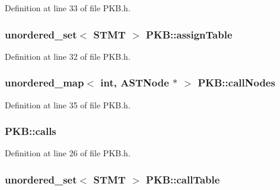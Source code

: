 Definition at line 33 of file P\-K\-B.\-h.

\hypertarget{class_p_k_b_a616513239f3fa6971424332dfabe0ead}{
\subsubsection[{assign\-Table}]{\setlength{\rightskip}{0pt plus 5cm}unordered\-\_\-set$<$ {\bf S\-T\-M\-T} $>$ P\-K\-B\-::assign\-Table\hspace{0.3cm}{\ttfamily [static]}}}\label{class_p_k_b_a616513239f3fa6971424332dfabe0ead}


Definition at line 32 of file P\-K\-B.\-h.

\hypertarget{class_p_k_b_a54cdb3a6553fd54b689a812d3187ccce}{
\subsubsection[{call\-Nodes}]{\setlength{\rightskip}{0pt plus 5cm}unordered\-\_\-map$<$ int, {\bf A\-S\-T\-Node} $\ast$ $>$ P\-K\-B\-::call\-Nodes\hspace{0.3cm}{\ttfamily [static]}}}\label{class_p_k_b_a54cdb3a6553fd54b689a812d3187ccce}


Definition at line 35 of file P\-K\-B.\-h.

\hypertarget{class_p_k_b_a7876c3653d636ee8a726941d0f98e3ae}{
\subsubsection[{calls}]{ P\-K\-B\-::calls\hspace{0.3cm}{\ttfamily [static]}}}\label{class_p_k_b_a7876c3653d636ee8a726941d0f98e3ae}


Definition at line 26 of file P\-K\-B.\-h.

\hypertarget{class_p_k_b_a4df9c934e4846c58863ed3513a1ff34a}{
\subsubsection[{call\-Table}]{\setlength{\rightskip}{0pt plus 5cm}unordered\-\_\-set$<$ {\bf S\-T\-M\-T} $>$ P\-K\-B\-::call\-Table\hspace{0.3cm}{\ttfamily [static]}}}\label{class_p_k_b_a4df9c934e4846c58863ed3513a1ff34a}


